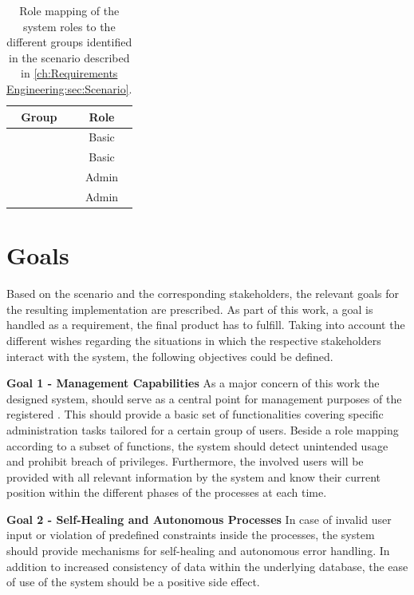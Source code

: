 \begingroup
\setlength{\tabcolsep}{10pt} %
\renewcommand{\arraystretch}{1.5} %
\begin{table}[h]
    \centering
    \caption{Role mapping of the system roles to the different groups identified in the scenario described in \ref{ch:Requirements Engineering:sec:Scenario}.}
    \begin{tabular}{c|c}
        Group & Role \\
        \hline
        \nameref{ch:Requirements Engineering:sec:Stakeholders:ssec:Student} & Basic \\
        \nameref{ch:Requirements Engineering:sec:Stakeholders:ssec:Staff} & Basic \\
        \nameref{ch:Requirements Engineering:sec:Stakeholders:ssec:Staff:sssec:Maintenance Personal} & Admin \\
        \nameref{ch:Requirements Engineering:sec:Stakeholders:ssec:Staff:sssec:Administration} & Admin
    \end{tabular}
    \label{tab:stakeholder-role-mapping}
\end{table}
\endgroup

\section{Goals}
\label{ch:Requirements Engineering:sec:Goals}

Based on the scenario and the corresponding stakeholders, the relevant goals for the resulting implementation are prescribed. As part of this work, a goal is handled as a requirement, the final product has to fulfill. 
Taking into account the different wishes regarding the situations in which the respective stakeholders interact with the system, the following objectives could be defined.

\noindent \textbf{Goal 1 - Management Capabilities} As a major concern of this work the designed system, should serve as a central point for management purposes of the registered . This should provide a basic set of functionalities covering specific administration tasks tailored for a certain group of users. 
Beside a role mapping according to a subset of functions, the system should detect unintended usage and prohibit breach of privileges.
Furthermore, the involved users will be provided with all relevant information by the system and know their current position within the different phases of the processes at each time. 

\noindent \textbf{Goal 2 - Self-Healing and Autonomous Processes} In case of invalid user input or violation of predefined constraints inside the processes, the system should provide mechanisms for self-healing and autonomous error handling. 
In addition to increased consistency of data within the underlying database, the ease of use of the system should be a positive side effect.

